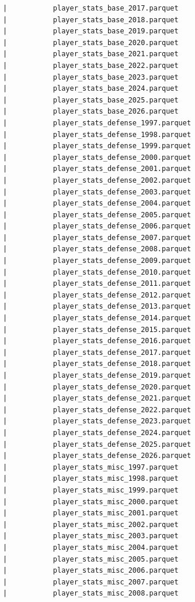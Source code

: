 \begin{lstlisting}
      |           player_stats_base_2017.parquet
      |           player_stats_base_2018.parquet
      |           player_stats_base_2019.parquet
      |           player_stats_base_2020.parquet
      |           player_stats_base_2021.parquet
      |           player_stats_base_2022.parquet
      |           player_stats_base_2023.parquet
      |           player_stats_base_2024.parquet
      |           player_stats_base_2025.parquet
      |           player_stats_base_2026.parquet
      |           player_stats_defense_1997.parquet
      |           player_stats_defense_1998.parquet
      |           player_stats_defense_1999.parquet
      |           player_stats_defense_2000.parquet
      |           player_stats_defense_2001.parquet
      |           player_stats_defense_2002.parquet
      |           player_stats_defense_2003.parquet
      |           player_stats_defense_2004.parquet
      |           player_stats_defense_2005.parquet
      |           player_stats_defense_2006.parquet
      |           player_stats_defense_2007.parquet
      |           player_stats_defense_2008.parquet
      |           player_stats_defense_2009.parquet
      |           player_stats_defense_2010.parquet
      |           player_stats_defense_2011.parquet
      |           player_stats_defense_2012.parquet
      |           player_stats_defense_2013.parquet
      |           player_stats_defense_2014.parquet
      |           player_stats_defense_2015.parquet
      |           player_stats_defense_2016.parquet
      |           player_stats_defense_2017.parquet
      |           player_stats_defense_2018.parquet
      |           player_stats_defense_2019.parquet
      |           player_stats_defense_2020.parquet
      |           player_stats_defense_2021.parquet
      |           player_stats_defense_2022.parquet
      |           player_stats_defense_2023.parquet
      |           player_stats_defense_2024.parquet
      |           player_stats_defense_2025.parquet
      |           player_stats_defense_2026.parquet
      |           player_stats_misc_1997.parquet
      |           player_stats_misc_1998.parquet
      |           player_stats_misc_1999.parquet
      |           player_stats_misc_2000.parquet
      |           player_stats_misc_2001.parquet
      |           player_stats_misc_2002.parquet
      |           player_stats_misc_2003.parquet
      |           player_stats_misc_2004.parquet
      |           player_stats_misc_2005.parquet
      |           player_stats_misc_2006.parquet
      |           player_stats_misc_2007.parquet
      |           player_stats_misc_2008.parquet

\end{lstlisting}
